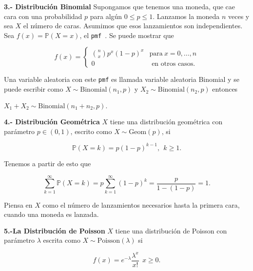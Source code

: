 \documentclass{article}\usepackage[]{graphicx}\usepackage[]{color}
\begin{document}
\vspace{0.5cm}

\textbf{3.- Distribuci\'on Binomial} Supongamos que tenemos una moneda, que cae cara con una probabilidad $p$ para alg\'un $0 \leq p \leq 1$. Lanzamos la moneda $n$ veces y sea $X$ el n\'umero de caras. Asumimos que esos lanzamientos son independientes. Sea $f(x) = \mathbb{P}(X = x)$, el \texttt{pmf }. Se puede mostrar que


\[
f(x) = \begin{cases}
\binom{n}{x}p^{x}(1 - p)^{x} & \mbox{para} \ x =0, \dots ,n\\
0 & \mbox{ en otros casos.}
\end{cases}
\]

Una variable aleatoria con este \texttt{pmf} es llamada variable aleatoria Binomial y se puede escribir como $X \sim \mbox{Binomial}(n_1, p)$ y $X_2 \sim \mbox{Binomial}(n_2, p)$ entonces 

$X_1 + X_2 \sim \mbox{Binomial}(n_1 + n_2, p)$.


\vspace{0.5cm}

\textbf{4.- Distribuci\'on Geom\'etrica} $X$ tiene una distribuci\'on geom\'etrica con par\'ametro $p \in (0,1)$, escrito como $X \sim \mbox{Geom}(p)$, si

\[
\mathbb{P}(X = k) = p(1 -p)^{k -1}, \ \ k \geq 1.
\]

\vspace{0.2cm}

Tenemos a partir de esto que

\vspace{0.2cm}

\[
\sum_{k = 1}^{\infty}\mathbb{P}(X= k) = p\sum_{k = 1}^{\infty}(1 - p)^{k} = \frac{p}{ 1 - (1 - p)} = 1.
\]

\vspace{0.2cm}

Piensa en $X$ como el n\'umero de lanzamientos necesarios hasta  la primera cara, cuando una moneda es lanzada.

\vspace{0.5cm}

\textbf{5.-La Distribuci\'on de Poisson} $X$ tiene una distribuci\'on de Poisson con par\'ametro $\lambda$ escrita como $X \sim \mbox{Poisson} (\lambda)$ si

\[
f(x) = e^{-\lambda}\frac{\lambda^{x}}{x!} \ \ x \geq 0.
\]

\vspace{0.2cm}
\end{document}
